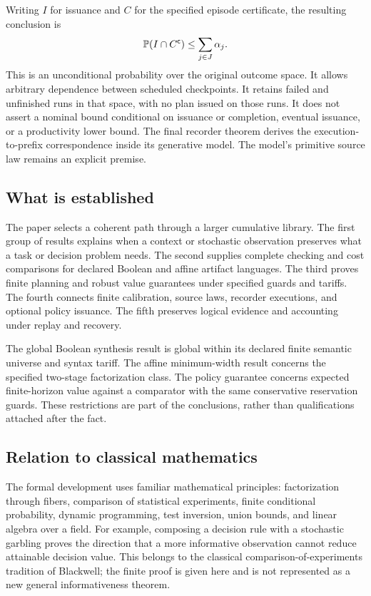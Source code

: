 
Writing $I$ for issuance and $C$ for the specified episode certificate, the resulting conclusion is
\[
 \mathbb P(I\cap C^{\mathsf c})\leq\sum_{j\in J}\alpha_j.
\]
This is an unconditional probability over the original outcome space. It allows arbitrary dependence between scheduled checkpoints. It retains failed and unfinished runs in that space, with no plan issued on those runs. It does not assert a nominal bound conditional on issuance or completion, eventual issuance, or a productivity lower bound. The final recorder theorem derives the execution-to-prefix correspondence inside its generative model. The model's primitive source law remains an explicit premise.

\subsection{What is established}
The paper selects a coherent path through a larger cumulative library. The first group of results explains when a context or stochastic observation preserves what a task or decision problem needs. The second supplies complete checking and cost comparisons for declared Boolean and affine artifact languages. The third proves finite planning and robust value guarantees under specified guards and tariffs. The fourth connects finite calibration, source laws, recorder executions, and optional policy issuance. The fifth preserves logical evidence and accounting under replay and recovery.

The global Boolean synthesis result is global within its declared finite semantic universe and syntax tariff. The affine minimum-width result concerns the specified two-stage factorization class. The policy guarantee concerns expected finite-horizon value against a comparator with the same conservative reservation guards. These restrictions are part of the conclusions, rather than qualifications attached after the fact.

\subsection{Relation to classical mathematics}
The formal development uses familiar mathematical principles: factorization through fibers, comparison of statistical experiments, finite conditional probability, dynamic programming, test inversion, union bounds, and linear algebra over a field. For example, composing a decision rule with a stochastic garbling proves the direction that a more informative observation cannot reduce attainable decision value. This belongs to the classical comparison-of-experiments tradition of Blackwell; the finite proof is given here and is not represented as a new general informativeness theorem.

